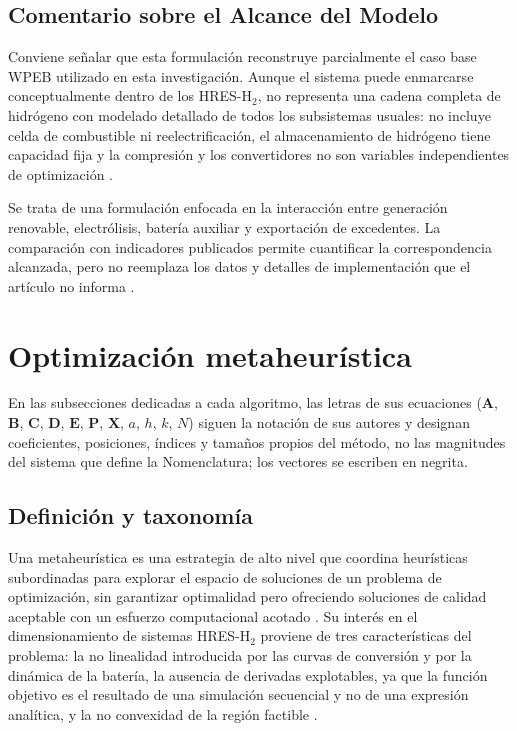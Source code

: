 \subsection{Comentario sobre el Alcance del Modelo}
\label{sec:alcance_wpeb}

Conviene señalar que esta formulación reconstruye parcialmente el caso base WPEB utilizado en esta investigación. Aunque el sistema puede enmarcarse conceptualmente dentro de los HRES-H$_2$, no representa una cadena completa de hidrógeno con modelado detallado de todos los subsistemas usuales: no incluye celda de combustible ni reelectrificación, el almacenamiento de hidrógeno tiene capacidad fija y la compresión y los convertidores no son variables independientes de optimización \cite{Li2024WPEB,Khan2022Review}.

Se trata de una formulación enfocada en la interacción entre generación renovable, electrólisis, batería auxiliar y exportación de excedentes. La comparación con indicadores publicados permite cuantificar la correspondencia alcanzada, pero no reemplaza los datos y detalles de implementación que el artículo no informa \cite{Li2024WPEB}.

\section{Optimización metaheurística}

En las subsecciones dedicadas a cada algoritmo, las letras de sus ecuaciones ($\mathbf A$, $\mathbf B$, $\mathbf C$, $\mathbf D$, $\mathbf E$, $\mathbf P$, $\mathbf X$, $a$, $h$, $k$, $N$) siguen la notación de sus autores y designan coeficientes, posiciones, índices y tamaños propios del método, no las magnitudes del sistema que define la Nomenclatura; los vectores se escriben en negrita.

\subsection{Definición y taxonomía}

Una metaheurística es una estrategia de alto nivel que coordina heurísticas subordinadas para explorar el espacio de soluciones de un problema de optimización, sin garantizar optimalidad pero ofreciendo soluciones de calidad aceptable con un esfuerzo computacional acotado \cite{Blum2003Overview,Talbi2009Metaheuristics}. Su interés en el dimensionamiento de sistemas HRES-H$_2$ proviene de tres características del problema: la no linealidad introducida por las curvas de conversión y por la dinámica de la batería, la ausencia de derivadas explotables, ya que la función objetivo es el resultado de una simulación secuencial y no de una expresión analítica, y la no convexidad de la región factible \cite{Khan2022Review}.


